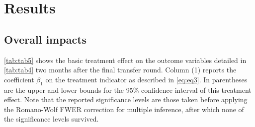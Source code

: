 \documentclass[12pt]{article}
\begin{document}
\section{Results}
\label{sec:section6}
\subsection{Overall impacts}
\autoref{tab:tab5} shows the basic treatment effect on the outcome variables detailed in \autoref{tab:tab4} two months after the final transfer round. Column (1) reports the coefficient $\beta_1$ on the treatment indicator as described in \autoref{eq:eq3}. In parentheses are the upper and lower bounds for the 95\% confidence interval of this treatment effect. Note that the reported significance levels are those taken before applying the Romano-Wolf FWER correction for multiple inference, after which none of the significance levels survived.
\end{document}
